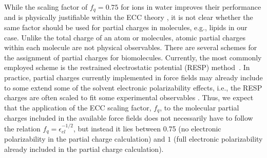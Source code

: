 \documentclass[aip,jcp,twocolumn]{revtex4}
\begin{document}
While the scaling factor of $f_q = 0.75$ for ions in water improves their performance and is physically justifiable within the ECC theory \cite{Leontyev2011},
it is not clear whether the same factor should be used for partial charges in molecules,
e.g., lipids in our case. Unlike the total charge of an atom or molecules, atomic partial charges within each molecule are not physical observables.
There are several schemes for the assignment of partial charges for biomolecules. \cite{Hu2007}
Currently, the most commonly employed scheme is the restrained electrostatic potential (RESP) method~\cite{RESP_paper,Singh1984}.
%
%
In practice, partial charges currently implemented in force fields may already 
include  to some extend some of the solvent electronic polarizability effects, i.e.,
the RESP charges are often scaled to fit some experimental observables . 
Thus, we expect that the application of the ECC scaling factor, $f_q$, to the molecular partial charges
included in the available force fields does not necessarily have to follow the relation $f_q = \epsilon _{el} ^{-1/2}$, 
but instead it lies between 0.75 (no electronic polarizability in the partial charge calculation)
and $1$ (full electronic polarizability already included in the partial charge calculation).
%
%
%
%
%
\end{document}
